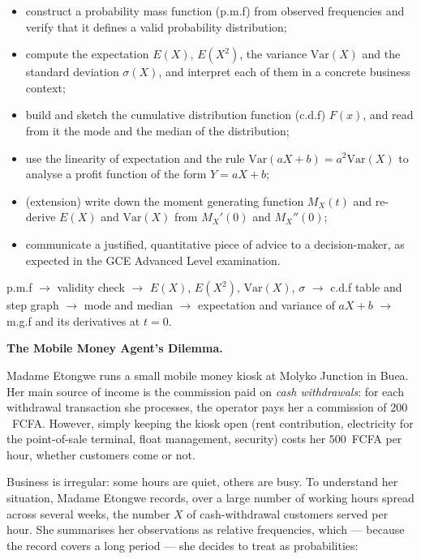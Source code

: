 \documentclass[11pt]{article}
\newcommand{\cle}[1]{{\popxbold\color{popdark}#1}}
\newcounter{popsec}
\newcounter{popsub}
\newcommand{\courssub}[1]{%
  \stepcounter{popsub}%
  \par\vspace{9pt}\noindent{\popxbold\fontsize{11.5}{13}\selectfont\color{popink}{\color{poporange}\thepopsec.\thepopsub}\hspace{6pt}#1}\par\nopagebreak\vspace{4pt}
}
\begin{document}
\begin{itemize}
\item construct a \cle{probability mass function} (p.m.f) from observed frequencies and verify that it defines a valid probability distribution;
\item compute the \cle{expectation} $E(X)$, $E(X^2)$, the \cle{variance} $\mathrm{Var}(X)$ and the \cle{standard deviation} $\sigma(X)$, and interpret each of them in a concrete business context;
\item build and sketch the \cle{cumulative distribution function} (c.d.f) $F(x)$, and read from it the \cle{mode} and the \cle{median} of the distribution;
\item use the \cle{linearity of expectation} and the rule $\mathrm{Var}(aX+b)=a^2\mathrm{Var}(X)$ to analyse a profit function of the form $Y=aX+b$;
\item (extension) write down the \cle{moment generating function} $M_X(t)$ and re-derive $E(X)$ and $\mathrm{Var}(X)$ from $M_X'(0)$ and $M_X''(0)$;
\item communicate a justified, quantitative piece of advice to a decision-maker, as expected in the GCE Advanced Level examination.
\end{itemize}

\begin{aretenir}
p.m.f $\rightarrow$ validity check $\rightarrow$ $E(X)$, $E(X^2)$, $\mathrm{Var}(X)$, $\sigma$ $\rightarrow$ c.d.f table and step graph $\rightarrow$ mode and median $\rightarrow$ expectation and variance of $aX+b$ $\rightarrow$ m.g.f and its derivatives at $t=0$.
\end{aretenir}

\courssub{Situation}

\textbf{The Mobile Money Agent's Dilemma.}\par

Madame Etongwe runs a small mobile money kiosk at Molyko Junction in Buea. Her main source of income is the commission paid on \emph{cash withdrawals}: for each withdrawal transaction she processes, the operator pays her a commission of $200$~FCFA. However, simply keeping the kiosk open (rent contribution, electricity for the point-of-sale terminal, float management, security) costs her $500$~FCFA per hour, whether customers come or not.

Business is irregular: some hours are quiet, others are busy. To understand her situation, Madame Etongwe records, over a large number of working hours spread across several weeks, the number $X$ of cash-withdrawal customers served per hour. She summarises her observations as relative frequencies, which — because the record covers a long period — she decides to treat as probabilities:
\end{document}
